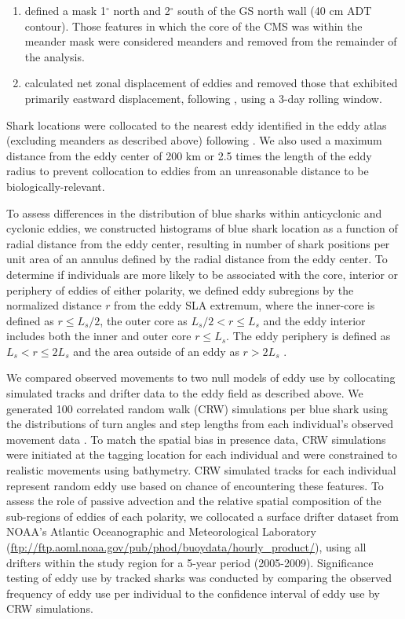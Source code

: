 \begin{enumerate} 
\item defined a mask 1$^\circ$ north and 2$^\circ$ south of the GS north wall (40 cm ADT contour). Those features in which the core of the CMS was within the meander mask were considered meanders and removed from the remainder of the analysis. 
\item calculated net zonal displacement of eddies and removed those that exhibited primarily eastward displacement, following \citep{Gaube2017DSR}, using a 3-day rolling window. 
\end{enumerate}

Shark locations were collocated to the nearest eddy identified in the eddy atlas (excluding meanders as described above) following \citep{Gaube2017}. We also used a maximum distance from the eddy center of 200 km or 2.5 times the length of the eddy radius to prevent collocation to eddies from an unreasonable distance to be biologically-relevant.

To assess differences in the distribution of blue sharks within anticyclonic and cyclonic eddies, we constructed histograms of blue shark location as a function of radial distance from the eddy center, resulting in number of shark positions per unit area of an annulus defined by the radial distance from the eddy center. To determine if individuals are more likely to be associated with the core, interior or periphery of eddies of either polarity, we defined eddy subregions by the normalized distance $r$ from the eddy SLA extremum, where the inner-core is defined as $r \leq L_s/2$, the outer core as $L_s/2 < r \leq L_s$ and the eddy interior includes both the inner and outer core $r \leq L_s$. The eddy periphery is defined as $L_s < r \leq 2L_s$ and the area outside of an eddy as $r > 2L_s$ \citep[see Fig. 2 in][]{Gaube2017}.

We compared observed movements to two null models of eddy use by collocating simulated tracks and drifter data to the eddy field as described above. We generated 100 correlated random walk (CRW) simulations per blue shark using the distributions of turn angles and step lengths from each individual's observed movement data \citep[\texttt{adehabitatLT} \texttt{R} package;][]{Calenge2006}. To match the spatial bias in presence data, CRW simulations were initiated at the tagging location for each individual and were constrained to realistic movements using bathymetry. CRW simulated tracks for each individual represent random eddy use based on chance of encountering these features. To assess the role of passive advection and the relative spatial composition of the sub-regions of eddies of each polarity, we collocated a surface drifter dataset from NOAA's Atlantic Oceanographic and Meteorological Laboratory (\url{ftp://ftp.aoml.noaa.gov/pub/phod/buoydata/hourly_product/}), using all drifters within the study region for a 5-year period (2005-2009). Significance testing of eddy use by tracked sharks was conducted by comparing the observed frequency of eddy use per individual to the confidence interval of eddy use by CRW simulations.

